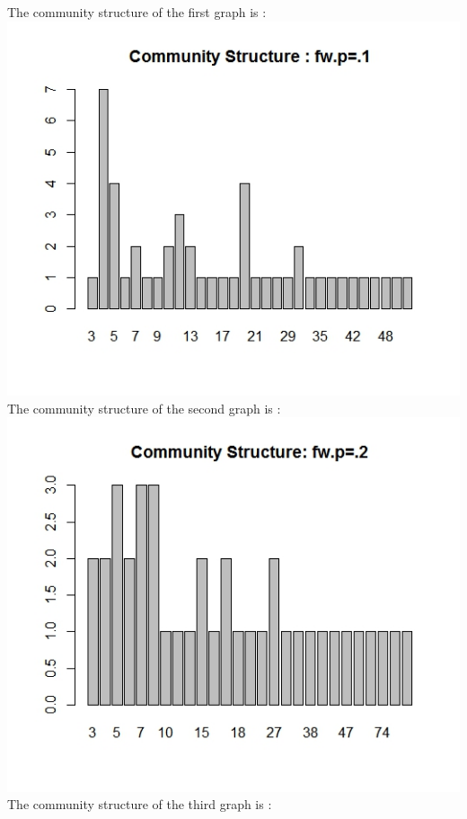 \documentclass{article}
\begin{document}
The community structure of the first graph is :\\
\includegraphics[scale=0.4]{pd3} \\
The community structure of the second graph is :\\
\includegraphics[scale=0.4]{pd8} \\
The community structure of the third graph is :\\
\end{document}
